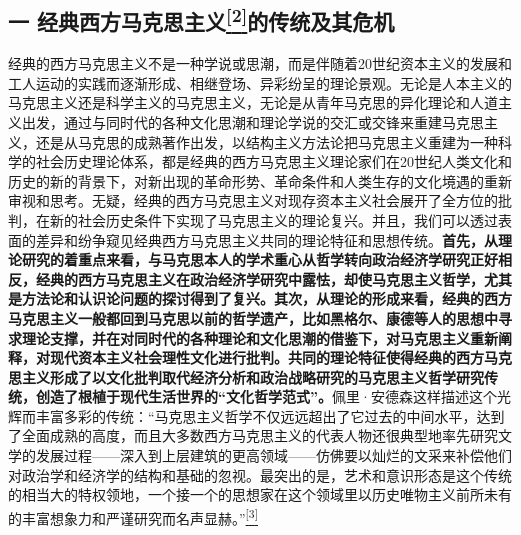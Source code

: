 \documentclass[UTF8, fontset = sourcesans, a4paper, oneside, zihao =
-4, scheme=chinese, no-math, space=true]{ctexbook}
\begin{document}
\subsection[一
经典西方马克思主义\protect\hyperlink{part0005_split_003.htmlux5cux23m2}{\textsuperscript{{[}2{]}}}的传统及其危机]{\texorpdfstring{一
经典西方马克思主义\protect\hypertarget{part0005_split_001.htmlux5cux23w2}{}{}\protect\hyperlink{part0005_split_003.htmlux5cux23m2}{\textsuperscript{{[}2{]}}}的传统及其危机}{一 经典西方马克思主义{[}2{]}的传统及其危机}}\label{part0005_split_001.htmlux5cux23c004}

经典的西方马克思主义不是一种学说或思潮，而是伴随着20世纪资本主义的发展和工人运动的实践而逐渐形成、相继登场、异彩纷呈的理论景观。无论是人本主义的马克思主义还是科学主义的马克思主义，无论是从青年马克思的异化理论和人道主义出发，通过与同时代的各种文化思潮和理论学说的交汇或交锋来重建马克思主义，还是从马克思的成熟著作出发，以结构主义方法论把马克思主义重建为一种科学的社会历史理论体系，都是经典的西方马克思主义理论家们在20世纪人类文化和历史的新的背景下，对新出现的革命形势、革命条件和人类生存的文化境遇的重新审视和思考。无疑，经典的西方马克思主义对现存资本主义社会展开了全方位的批判，在新的社会历史条件下实现了马克思主义的理论复兴。并且，我们可以透过表面的差异和纷争窥见经典西方马克思主义共同的理论特征和思想传统。\textbf{首先，从理论研究的着重点来看，与马克思本人的学术重心从哲学转向政治经济学研究正好相反，经典的西方马克思主义在政治经济学研究中露怯，却使马克思主义哲学，尤其是方法论和认识论问题的探讨得到了复兴。其次，从理论的形成来看，经典的西方马克思主义一般都回到马克思以前的哲学遗产，比如黑格尔、康德等人的思想中寻求理论支撑，并在对同时代的各种理论和文化思潮的借鉴下，对马克思主义重新阐释，对现代资本主义社会理性文化进行批判。共同的理论特征使得经典的西方马克思主义形成了以文化批判取代经济分析和政治战略研究的马克思主义哲学研究传统，创造了根植于现代生活世界的``文化哲学范式''。}佩里·安德森这样描述这个光辉而丰富多彩的传统：``马克思主义哲学不仅远远超出了它过去的中间水平，达到了全面成熟的高度，而且大多数西方马克思主义的代表人物还很典型地率先研究文学的发展过程------深入到上层建筑的更高领域------仿佛要以灿烂的文采来补偿他们对政治学和经济学的结构和基础的忽视。最突出的是，艺术和意识形态是这个传统的相当大的特权领地，一个接一个的思想家在这个领域里以历史唯物主义前所未有的丰富想象力和严谨研究而名声显赫。''\protect\hypertarget{part0005_split_001.htmlux5cux23w3}{}{}\protect\hyperlink{part0005_split_003.htmlux5cux23m3}{\textsuperscript{{[}3{]}}}
\end{document}
